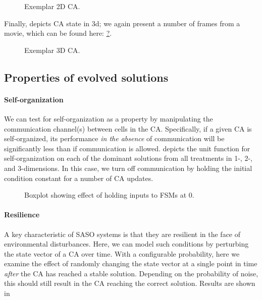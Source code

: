 \begin{figure}
\vspace{10em}
\caption{Exemplar 2D CA.}
\label{f:003-detail}
\end{figure}

Finally,  depicts CA state in 3d; we again present a number of frames from a movie, which can be found here: \url{?}.

\begin{figure}
\vspace{10em}
\caption{Exemplar 3D CA.}
\label{f:004-detail}
\end{figure}



\subsection{Properties of evolved solutions}

\paragraph{Self-organization}
We can test for self-organization as a property by manipulating the communication channel(s) between cells in the CA.  Specifically, if a given CA is self-organized, its performance {\em in the absence} of communication will be significantly less than if communication is allowed.   depicts the unit function  for self-organization on each of the dominant solutions from all treatments in 1-, 2-, and 3-dimensions.  In this case, we turn off communication by holding the initial condition constant for a number of CA updates.

\begin{figure}
\vspace{10em}
\caption{Boxplot showing effect of holding inputs to FSMs at 0.}
\label{f:selforg}
\end{figure}

\paragraph{Resilience}
A key characteristic of SASO systems is that they are resilient in the face of environmental disturbances.  Here, we can model such conditions by perturbing the state vector of a CA over time.  With a configurable probability, here we examine the effect of randomly changing the state vector at a single point in time {\em after} the CA has reached a stable solution.  Depending on the probability of noise, this should still result in the CA reaching the correct solution.  Results are shown in 


